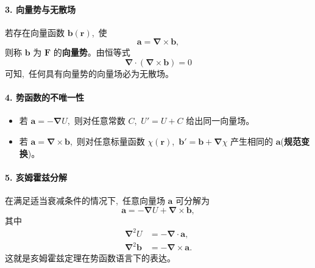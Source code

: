 \paragraph{3. 向量势与无散场}
若存在向量函数 $\boldsymbol b(\boldsymbol r)$, \,使
\begin{equation}
    \boldsymbol a = \boldsymbol{\nabla} \times \boldsymbol b,
\end{equation}
则称 $\boldsymbol b$ 为 $\boldsymbol F$ 的\textbf{向量势}。由恒等式
\begin{equation}
    \boldsymbol{\nabla}\cdot(\boldsymbol{\nabla}\times \boldsymbol b) = 0
\end{equation}
可知, \,任何具有向量势的向量场必为无散场。

\paragraph{4. 势函数的不唯一性}
\begin{itemize}
    \item 若 $\boldsymbol a = -\boldsymbol{\nabla}U$, \,则对任意常数 $C$, \,$U' = U + C$ 给出同一向量场。
    \item 若 $\boldsymbol a = \boldsymbol{\nabla}\times \boldsymbol b$, \,则对任意标量函数 $\chi(\boldsymbol r)$, \,$\boldsymbol b' = \boldsymbol b + \boldsymbol{\nabla} \chi$ 产生相同的 $\boldsymbol a$(\textbf{规范变换})。
\end{itemize}

\paragraph{5. 亥姆霍兹分解}
在满足适当衰减条件的情况下, \,任意向量场 $\boldsymbol a$ 可分解为
\begin{equation}
    \boldsymbol a
    = -\boldsymbol{\nabla}U + \boldsymbol{\nabla}\times \boldsymbol b,
\end{equation}
其中
\begin{align}
    \boldsymbol{\nabla}^2 U &= -\boldsymbol{\nabla}\cdot \boldsymbol a,\\
    \boldsymbol{\nabla}^2 \boldsymbol b &= -\boldsymbol{\nabla}\times \boldsymbol a.
\end{align}
这就是亥姆霍兹定理在势函数语言下的表达。

